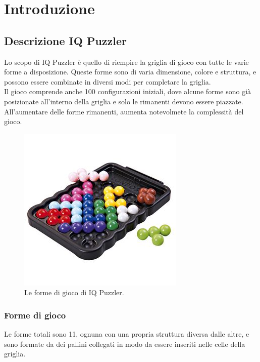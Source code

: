 
\chapter{Introduzione}
\label{cap:introduzione}
\section{Descrizione IQ Puzzler}
Lo scopo di IQ Puzzler è quello di riempire la griglia di gioco con tutte le varie forme a disposizione. Queste forme sono di varia dimensione, colore e struttura, e possono essere combinate in diversi modi per completare la griglia.\\
Il gioco comprende anche 100 configurazioni iniziali, dove alcune forme sono già posizionate all'interno della griglia e solo le rimanenti devono essere piazzate. All'aumentare delle forme rimanenti, aumenta notevolmete la complessità del gioco.\\ 
\begin{figure}[h]
	\centering
	\includegraphics[scale=0.5]{immagini/iqpuzzler}
	\caption{Le forme di gioco di IQ Puzzler.}
	\label{fig:iqpuzzler}
\end{figure}

\newpage
\subsection{Forme di gioco}
Le forme totali sono 11, ognuna con una propria struttura diversa dalle altre, e sono formate da dei pallini collegati in modo da essere inseriti nelle celle della griglia.


